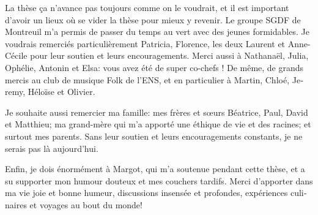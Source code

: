 \begin{otherlanguage}{french}
La thèse ça n'avance pas toujours comme on le voudrait, et il est important
d'avoir un lieux où se vider la thèse pour mieux y revenir. Le groupe SGDF de
Montreuil m'a permis de passer du temps au vert avec des jeunes formidables. Je
voudrais remerciés particulièrement Patricia, Florence, les deux Laurent et
Anne-Cécile pour leur soutien et leurs encouragements. Merci aussi à Nathanaël,
Julia, Ophélie, Antonin et Elsa: vous avez été de super co-chefs ! De même, de
grands mercis au club de musique Folk de l'ENS, et en particulier à Martin,
Chloé, Jeremy, Héloïse et Olivier.

Je souhaite aussi remercier ma famille: mes frères et sœurs Béatrice, Paul,
David et Matthieu; ma grand-mère qui m'a apporté une éthique de vie et des
racines; et surtout mes parents. Sans leur soutien et leurs encouragements
constants, je ne serais pas là aujourd'hui.

Enfin, je dois énormément à Margot, qui m'a soutenue pendant cette thèse, et a
su supporter mon humour douteux et mes couchers tardifs. Merci d'apporter dans
ma vie joie et bonne humeur, discussions insensée et profondes, expériences
culinaires et voyages au bout du monde!

\endgroup

\clearpage
\mbox{}
\thispagestyle{empty}
\clearpage

\end{otherlanguage}
